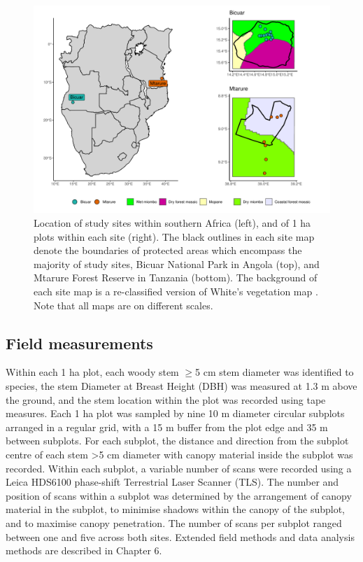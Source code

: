 \documentclass[11pt,a4paper]{article}
\begin{document}
\begin{figure}
	\includegraphics[width=\linewidth]{map}
	\caption{Location of study sites within southern Africa (left), and of 1 ha plots within each site (right). The black outlines in each site map denote the boundaries of protected areas which encompass the majority of study sites, Bicuar National Park in Angola (top), and Mtarure Forest Reserve in Tanzania (bottom). The background of each site map is a re-classified version of White's vegetation map \citep{White1983}. Note that all maps are on different scales.}
	\label{map}
\end{figure}

\subsection{Field measurements}

Within each 1 ha plot, each woody stem $\ge{}$5 cm stem diameter was identified to species, the stem Diameter at Breast Height (DBH) was measured at 1.3 m above the ground, and the stem location within the plot was recorded using tape measures. Each 1 ha plot was sampled by nine 10 m diameter circular subplots arranged in a regular grid, with a 15 m buffer from the plot edge and 35 m between subplots. For each subplot, the distance and direction from the subplot centre of each stem >5 cm diameter with canopy material inside the subplot was recorded. Within each subplot, a variable number of scans were recorded using a Leica HDS6100 phase-shift Terrestrial Laser Scanner (TLS). The number and position of scans within a subplot was determined by the arrangement of canopy material in the subplot, to minimise shadows within the canopy of the subplot, and to maximise canopy penetration. The number of scans per subplot ranged between one and five across both sites. Extended field methods and data analysis methods are described in Chapter 6.
\end{document}
